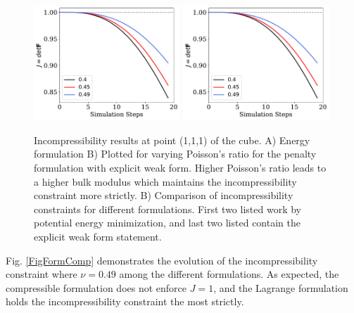 \documentclass[12pt,3p]{article}
\begin{document}
\begin{figure}[!htb]
\centering
\includegraphics[width=0.49\textwidth]{./Images/EnergyPenalty_J_Nu_v}
\includegraphics[width=0.49\textwidth]{./Images/WeakFormU_J_Nu_v}
\caption{Incompressibility results at point (1,1,1) of the cube. A) Energy formulation B) Plotted for varying Poisson's ratio for the penalty formulation with explicit weak form. Higher Poisson's ratio leads to a higher bulk modulus which maintains the incompressibility constraint more strictly. B) Comparison of incompressibility constraints for different formulations. First two listed work by potential energy minimization, and last two listed contain the explicit weak form statement. }
\label{FigWeakFormU_J}
\end{figure}

\newpage

Fig. \ref{FigFormComp} demonstrates the evolution of the incompressibility constraint where $\nu = 0.49$ among the different formulations. As expected, the compressible formulation does not enforce $J = 1$, and the Lagrange formulation holds the incompressibility constraint the most strictly. 
\end{document}
